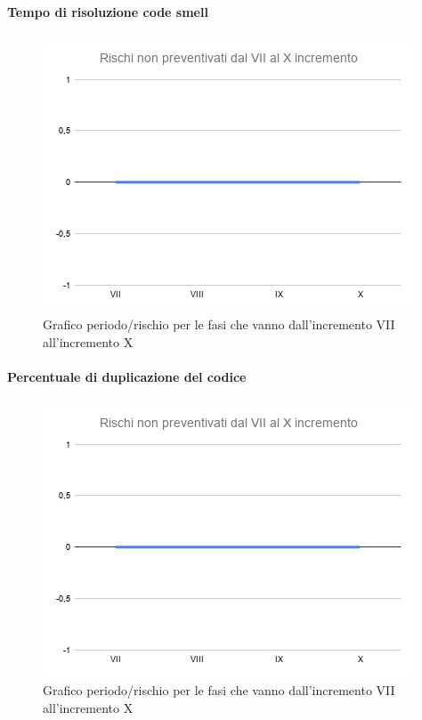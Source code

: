 \paragraph{Tempo di risoluzione code smell}
\begin{figure}[H]
			\centering%
			\includegraphics[width=0.8\linewidth]{./res/images/RischiNonPreven_4.png}
			\caption{Grafico periodo/rischio per le fasi che vanno dall'incremento VII all'incremento X}
			\label{fig:Grafico periodo/rischio per le fasi che vanno dall'incremento VII all'incremento X}
	\end{figure}
\paragraph{Percentuale di duplicazione del codice}
\begin{figure}[H]
			\centering%
			\includegraphics[width=0.8\linewidth]{./res/images/RischiNonPreven_4.png}
			\caption{Grafico periodo/rischio per le fasi che vanno dall'incremento VII all'incremento X}
			\label{fig:Grafico periodo/rischio per le fasi che vanno dall'incremento VII all'incremento X}
	\end{figure}

